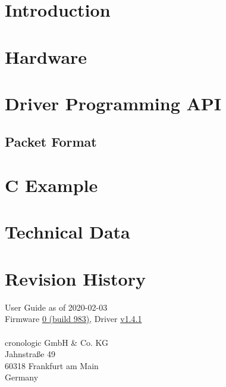 \documentclass[11pt,notitlepage]{scrreprt}
\newcommand{\ttinput}[1]{}
\newcommand{\ttinput}[1]{}
\begin{document}
 
%
	\chapter{Introduction}
		\ttinput{Intro.tex}
	\chapter{Hardware}
		
	\chapter{Driver Programming API} 
		
	\section{Packet Format\label{cp:packetformat}}
		
	\chapter{C Example} 
		
	\chapter{Technical Data}  
		
		\newpage
		
	\chapter{Revision History}
		\noindent
		User Guide \hyperlink{ugrev}{\ugrev} as of 2020-02-03\\
		Firmware \hyperlink{fwrev}{0 (build 983)}, Driver \hyperlink{drvrev}{v1.4.1}\\
		\\
		cronologic GmbH \& Co. KG\\
		Jahnstraße 49\\
		60318 Frankfurt am Main\\Germany\\
		
		
		
\end{document}
